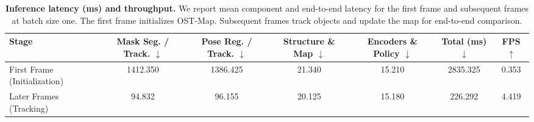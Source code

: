 \begin{table}[t]
    \centering
    \caption{\textbf{Inference latency (ms) and throughput.}
    We report mean component and end-to-end latency for the first frame and
    subsequent frames at batch size one. The first frame initializes OST-Map.
    Subsequent frames track objects and update the map for end-to-end comparison.}
    \label{tab:latency}
    \vspace{2pt}
    \footnotesize
    \renewcommand{\arraystretch}{1.22}
    \setlength{\tabcolsep}{2pt}
    \begin{adjustbox}{max width=1.0\columnwidth}
    \begin{tabular}{lcccccc}
        \toprule
        \rowcolor{tablehead}
        Stage
        & Mask Seg. / Track. $\downarrow$
        & Pose Reg. / Track. $\downarrow$
        & Structure \& Map $\downarrow$
        & Encoders \& Policy $\downarrow$
        & Total (ms) $\downarrow$
        & FPS $\uparrow$ \\
        \midrule
        First Frame (Initialization)
        & 1412.350 & 1386.425 & 21.340 & 15.210 & \cellcolor{blue1}2835.325 & 0.353 \\
        \addlinespace[3pt]
        Later Frames (Tracking)
        & 94.832 & 96.155 & 20.125 & 15.180 & \cellcolor{blue1}226.292 & 4.419 \\
        \bottomrule
    \end{tabular}
    \end{adjustbox}
    \vspace{-6pt}
\end{table}
